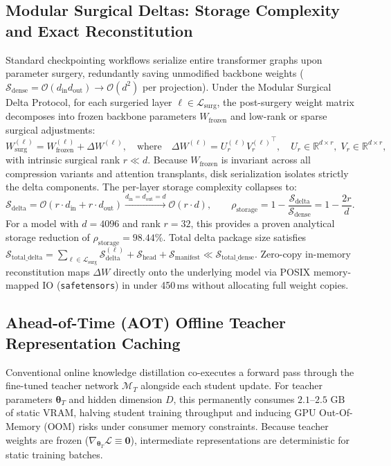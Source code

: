 \documentclass{article}
\begin{document}
\subsection{Modular Surgical Deltas: Storage Complexity and Exact Reconstitution}
\label{subsec:math_surgical_deltas}
Standard checkpointing workflows serialize entire transformer graphs upon parameter surgery, redundantly saving unmodified backbone weights ($\mathcal{S}_{\text{dense}} = \mathcal{O}(d_{\text{in}} d_{\text{out}}) \to \mathcal{O}(d^2)$ per projection). Under the Modular Surgical Delta Protocol, for each surgeried layer $\ell \in \mathcal{L}_{\text{surg}}$, the post-surgery weight matrix decomposes into frozen backbone parameters $W_{\text{frozen}}$ and low-rank or sparse surgical adjustments:
\begin{equation}
    W_{\text{surg}}^{(\ell)} = W_{\text{frozen}}^{(\ell)} + \Delta W^{(\ell)}, \quad \text{where} \quad \Delta W^{(\ell)} = U_r^{(\ell)} {V_r^{(\ell)}}^\top, \quad U_r \in \mathbb{R}^{d \times r}, \; V_r \in \mathbb{R}^{d \times r},
\end{equation}
with intrinsic surgical rank $r \ll d$. Because $W_{\text{frozen}}$ is invariant across all compression variants and attention transplants, disk serialization isolates strictly the delta components. The per-layer storage complexity collapses to:
\begin{equation}
    \mathcal{S}_{\text{delta}} = \mathcal{O}(r \cdot d_{\text{in}} + r \cdot d_{\text{out}}) \xrightarrow{d_{\text{in}}=d_{\text{out}}=d} \mathcal{O}(r \cdot d), \qquad \rho_{\text{storage}} = 1 - \frac{\mathcal{S}_{\text{delta}}}{\mathcal{S}_{\text{dense}}} = 1 - \frac{2 r}{d}.
\end{equation}
For a model with $d = 4096$ and rank $r = 32$, this provides a proven analytical storage reduction of $\rho_{\text{storage}} = 98.44\%$. Total delta package size satisfies $\mathcal{S}_{\text{total\_delta}} = \sum_{\ell \in \mathcal{L}_{\text{surg}}} \mathcal{S}_{\text{delta}}^{(\ell)} + \mathcal{S}_{\text{head}} + \mathcal{S}_{\text{manifest}} \ll \mathcal{S}_{\text{total\_dense}}$. Zero-copy in-memory reconstitution maps $\Delta W$ directly onto the underlying model via POSIX memory-mapped IO (\texttt{safetensors}) in under 450\,ms without allocating full weight copies.

\subsection{Ahead-of-Time (AOT) Offline Teacher Representation Caching}
\label{subsec:math_teacher_caching}
Conventional online knowledge distillation co-executes a forward pass through the fine-tuned teacher network $\mathcal{M}_T$ alongside each student update. For teacher parameters $\boldsymbol{\theta}_T$ and hidden dimension $D$, this permanently consumes $2.1\text{--}2.5\text{ GB}$ of static VRAM, halving student training throughput and inducing GPU Out-Of-Memory (OOM) risks under consumer memory constraints. Because teacher weights are frozen ($\nabla_{\boldsymbol{\theta}_T} \mathcal{L} \equiv \mathbf{0}$), intermediate representations are deterministic for static training batches.
\end{document}
